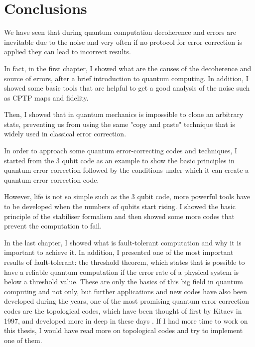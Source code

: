 \chapter{Conclusions}
We have seen that during quantum computation decoherence and errors are inevitable due to the noise and very often if no protocol for error correction is applied they can lead to incorrect results.

In fact, in the first chapter, I showed what are the causes of the decoherence and source of errors, after a brief introduction to quantum computing. In addition, I showed some basic tools that are helpful to get a good analysis of the noise such as CPTP maps and fidelity.

Then, I showed that in quantum mechanics is impossible to clone an arbitrary state, preventing us from using the same "copy and paste" technique that is widely used in classical error correction.

In order to approach some quantum error-correcting codes and techniques, I started from the 3 qubit code as an example to show the basic principles in quantum error correction followed by the conditions under which it can create a quantum error correction code.

However, life is not so simple such as the 3 qubit code, more powerful tools have to be developed when the numbers of qubits start rising. I showed the basic principle of the stabiliser formalism and then showed some more codes that prevent the computation to fail.

In the last chapter, I showed what is fault-tolerant computation and why it is important to achieve it. In addition, I presented one of the most important results of fault-tolerant: the threshold theorem, which states that is possible to have a reliable quantum computation if the error rate of a physical system is below a threshold value.   
These are only the basics of this big field in quantum computing and not only, but further applications and new codes have also been developed during the years, one of the most promising quantum error correction codes are the topological codes, which have been thought of first by Kitaev in 1997, and developed more in deep in these days \cite{Kitaev_1997} \cite{Spinmodel}.
If I had more time to work on this thesis, I would have read more on topological codes and try to implement one of them. 



